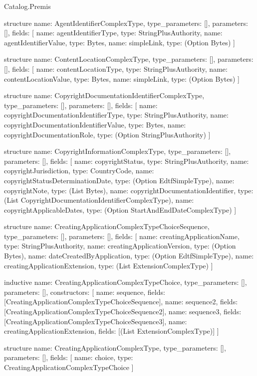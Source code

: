 \begin{lexlean}{Catalog.Premis}
\begin{semanticmodule}
structure{
  name: AgentIdentifierComplexType,
  type_parameters: [],
  parameters: [],
  fields: [
    {name: agentIdentifierType, type: StringPlusAuthority},
    {name: agentIdentifierValue, type: Bytes},
    {name: simpleLink, type: (Option Bytes)}
  ]
}

structure{
  name: ContentLocationComplexType,
  type_parameters: [],
  parameters: [],
  fields: [
    {name: contentLocationType, type: StringPlusAuthority},
    {name: contentLocationValue, type: Bytes},
    {name: simpleLink, type: (Option Bytes)}
  ]
}

structure{
  name: CopyrightDocumentationIdentifierComplexType,
  type_parameters: [],
  parameters: [],
  fields: [
    {name: copyrightDocumentationIdentifierType, type: StringPlusAuthority},
    {name: copyrightDocumentationIdentifierValue, type: Bytes},
    {name: copyrightDocumentationRole, type: (Option StringPlusAuthority)}
  ]
}

structure{
  name: CopyrightInformationComplexType,
  type_parameters: [],
  parameters: [],
  fields: [
    {name: copyrightStatus, type: StringPlusAuthority},
    {name: copyrightJurisdiction, type: CountryCode},
    {name: copyrightStatusDeterminationDate, type: (Option EdtfSimpleType)},
    {name: copyrightNote, type: (List Bytes)},
    {name: copyrightDocumentationIdentifier, type: (List CopyrightDocumentationIdentifierComplexType)},
    {name: copyrightApplicableDates, type: (Option StartAndEndDateComplexType)}
  ]
}

structure{
  name: CreatingApplicationComplexTypeChoiceSequence,
  type_parameters: [],
  parameters: [],
  fields: [
    {name: creatingApplicationName, type: StringPlusAuthority},
    {name: creatingApplicationVersion, type: (Option Bytes)},
    {name: dateCreatedByApplication, type: (Option EdtfSimpleType)},
    {name: creatingApplicationExtension, type: (List ExtensionComplexType)}
  ]
}

inductive{
  name: CreatingApplicationComplexTypeChoice,
  type_parameters: [],
  parameters: [],
  constructors: [
    {name: sequence, fields: [CreatingApplicationComplexTypeChoiceSequence]},
    {name: sequence2, fields: [CreatingApplicationComplexTypeChoiceSequence2]},
    {name: sequence3, fields: [CreatingApplicationComplexTypeChoiceSequence3]},
    {name: creatingApplicationExtension, fields: [(List ExtensionComplexType)]}
  ]
}

structure{
  name: CreatingApplicationComplexType,
  type_parameters: [],
  parameters: [],
  fields: [
    {name: choice, type: CreatingApplicationComplexTypeChoice}
  ]
}


\end{semanticmodule}
\end{lexlean}
